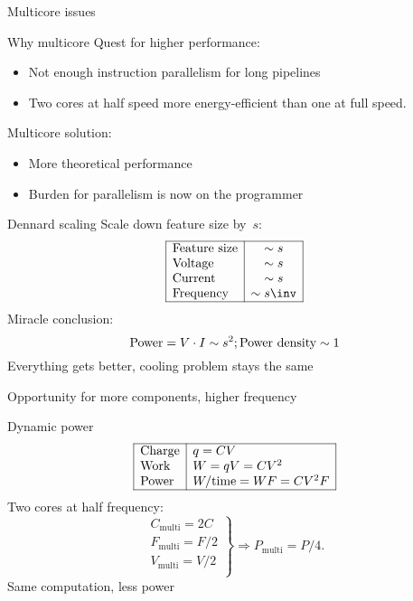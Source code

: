  {Multicore issues}

\begin{numberedframe}{Why multicore}
  Quest for higher performance:
  \begin{itemize}
  \item Not enough instruction parallelism for long pipelines
  \item Two cores at half speed more energy-efficient than one at full speed.
  \end{itemize}
  Multicore solution:
  \begin{itemize}
  \item More theoretical performance
  \item Burden for parallelism is now on the programmer
  \end{itemize}
\end{numberedframe}

\begin{numberedframe}{Dennard scaling}
Scale down feature size by~$s$:
\[
\begin{array}{|l|c|}\hline
\hbox{Feature size}&\sim s\\
\hbox{Voltage}&\sim s\\
\hbox{Current}&\sim s \\ 
\hbox{Frequency}&\sim s\inv\\
\hline
\end{array}
\]  
Miracle conclusion:
\[ \hbox{Power} = V\cdot I \sim s^2; \hbox{Power density}\sim 1 \]
Everything gets better, cooling problem stays the same

Opportunity for more components, higher frequency
\end{numberedframe}

\begin{numberedframe}{Dynamic power}
\begin{equation}
\begin{array}{|l|l|} \hline
\hbox{Charge}&q=CV\\
\hbox{Work}&W=qV=CV^2\\
\hbox{Power}&W/\hbox{time}=WF=CV^2F \\ \hline
\end{array}
\label{eq:power}
\end{equation}  
Two cores at half frequency:
\[ \left.
\begin{array}{c}
C_{\mathrm{multi}} = 2C\\
F_{\mathrm{multi}} = F/2\\
V_{\mathrm{multi}} = V/2\\
\end{array}\right\} \Rightarrow
P_{\mathrm{multi}} = P/4.
\]
Same computation, less power
\end{numberedframe}

